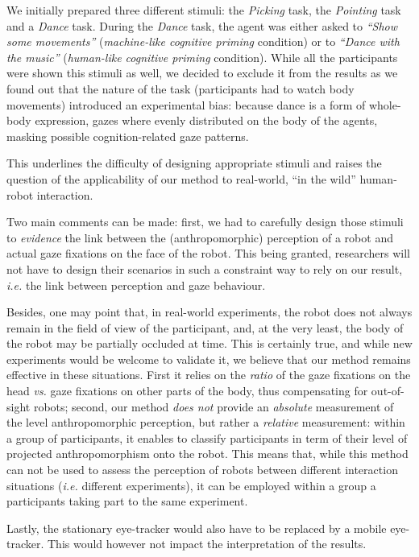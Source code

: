 \documentclass[lettersize, noapacite, twoside, HRI]{apa_HRI}
\newcommand{\ie}{\textit{i.e.}\xspace}
\newcommand{\vs}{\textit{vs.}\xspace}
\begin{document}
We initially prepared three different stimuli: the \emph{Picking} task, the
\emph{Pointing} task and a \emph{Dance} task.  During the \emph{Dance} task, the
agent was either asked to \emph{``Show some movements''} (\emph{machine-like
cognitive priming} condition) or to \emph{``Dance with the music''}
(\emph{human-like cognitive priming} condition). While all the participants were
shown this stimuli as well, we decided to exclude it from the results as we
found out that the nature of the task (participants had to watch body movements)
introduced an experimental bias: because dance is a form of whole-body
expression, gazes where evenly distributed on the body of the agents, masking
possible cognition-related gaze patterns.

This underlines the difficulty of designing appropriate stimuli and raises the
question of the applicability of our method to real-world, ``in the wild''
human-robot interaction.

Two main comments can be made: first, we had to carefully design those stimuli
to \emph{evidence} the link between the (anthropomorphic) perception of a robot
and actual gaze fixations on the face of the robot. This being granted,
researchers will not have to design their scenarios in such a constraint way to
rely on our result, \ie the link between perception and gaze behaviour.

Besides, one may point that, in real-world experiments, the robot does not
always remain in the field of view of the participant, and, at the very least, the
body of the robot may be partially occluded at time.  This is certainly true,
and while new experiments would be welcome to validate it, we believe that our
method remains effective in these situations. First it relies on the
\emph{ratio} of the gaze fixations on the head \vs gaze fixations on other parts
of the body, thus compensating for out-of-sight robots; second, our method
\emph{does not} provide an \emph{absolute} measurement of the level
anthropomorphic perception, but rather a \emph{relative} measurement: within a
group of participants, it enables to classify participants in term of their level of
projected anthropomorphism onto the robot.  This means that, while this method
can not be used to assess the perception of robots between different interaction
situations (\ie different experiments), it can be employed within a group a
participants taking part to the same experiment.

Lastly, the stationary eye-tracker would also have to be replaced by a mobile
eye-tracker. This would however not impact the interpretation of the results.
\end{document}
